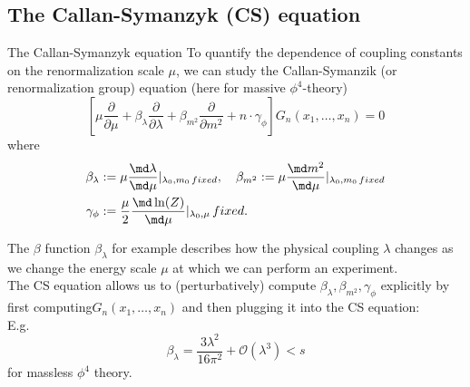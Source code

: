 \subsection{The Callan-Symanzyk (CS) equation}
\begin{mybox}{The Callan-Symanzyk equation}
	To quantify the dependence of coupling constants on the renormalization scale $\mu$, we can study the Callan-Symanzik (or renormalization group) equation (here for massive $\phi^4$-theory)
	\begin{equation}
	\left[\mu \frac{\partial}{\partial \mu} +\beta_{\lambda} \frac{\partial}{\partial \lambda} + \beta_{m^2} \frac{\partial}{\partial m^2} + n \cdot \gamma_{\phi}\right]G_n(x_1,\dots,x_n) = 0
	\end{equation}
	where 
\begin{align}
	\beta_{\lambda} &:= \mu \frac{\md \lambda}{\md \mu} |_{\lambda_0,m_0 \, fixed}, \quad \beta_{m^2} := \mu \frac{\md m^2}{\md \mu} |_{\lambda_0,m_0 \,fixed} \\
	\gamma_{\phi} &:= \frac{\mu}{2} \frac{\md \ln(Z) }{\md \mu} |_{\lambda_0,\mu} \, fixed.
\end{align}
\end{mybox}
\begin{mybox}{The $\beta$ function}
	$\beta_{\lambda}$ for example describes how the physical coupling $\lambda$ changes as we change the energy scale $\mu$ at which we can perform an experiment.\\
	The CS equation allows us to (perturbatively) compute $\beta_{\lambda},\beta_{m^2},\gamma_{\phi}$ explicitly by first computing$G_n(x_1,\dots,x_n)$ and then plugging it into the CS equation:\\
	E.g. \begin{equation}
		\beta_{\lambda} = \frac{3\lambda^2}{16 \pi^2} + \mathcal{O}(\lambda^3)<s
	\end{equation}
	for massless $\phi^4$ theory.
\end{mybox}


